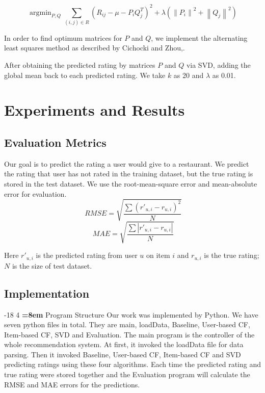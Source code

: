 \documentclass{llncs}
\makeatletter
\DeclareMathOperator*{\argmin}{argmin}
\renewcommand\subsubsection{\@startsection{subsubsection}{3}{\z@}%
	{-18\p@ \@plus -4\p@ \@minus -4\p@}%
	{4\p@ \@plus 2\p@ \@minus 2\p@}%
	{\normalfont\normalsize\bfseries\boldmath
		\rightskip=\z@ \@plus 8em\pretolerance=10000 }}
\makeatother
\begin{document}
\begin{equation}
\argmin_{P,Q}\sum_{(i,j)\in{R}}{(R_{ij} - \mu - P_iQ_{j}^{T})}^2 + \lambda({\left\|P_i\right\|}^2 + {\left\|Q_j\right\|}^2 )
\end{equation}

In order to find optimum matrices for $P$ and $Q$, we implement the alternating least squares method as described by Cichocki and Zhou\cite{Andrzej},\cite{Yunhong}.

After obtaining the predicted rating by matrices $P$ and $Q$ via SVD, adding the global mean back to each predicted rating. We take $k$ as 20 and $\lambda$ as 0.01.

\section{Experiments and Results}
%
\subsection{Evaluation Metrics}
Our goal is to predict the rating a user would give to a restaurant. We predict the rating that user has not rated in the training dataset, but the true rating is stored in the test dataset. We use the root-mean-square error and mean-absolute error for evaluation.
\begin{equation}
\ RMSE = \sqrt{\frac{\sum{\left(r'_{u,i} - r_{u,i}\right)}^2}{N}}
\end{equation}
\begin{equation}
\ MAE = \sqrt{\frac{\sum{\left|r'_{u,i} - r_{u,i}\right|}}{N}}
\end{equation}

Here $r'_{u,i}$ is the predicted rating from user $u$ on item $i$ and $r_{u,i}$ is the true rating; $N$ is the size of test dataset. 
\subsection{Implementation}
\subsubsection{Program Structure}
Our work was implemented by Python. We have seven python files in total. They are main, loadData, Baseline, User-based CF, Item-based CF, SVD and Evaluation. The main program is the controller of the whole recommendation system. At first, it invoked the loadData file for data parsing. Then it invoked Baseline, User-based CF, Item-based CF and SVD predicting ratings using these four algorithms. Each time the predicted rating and true rating were stored together and the Evaluation program will calculate the RMSE and MAE errors for the predictions. 
\end{document}
